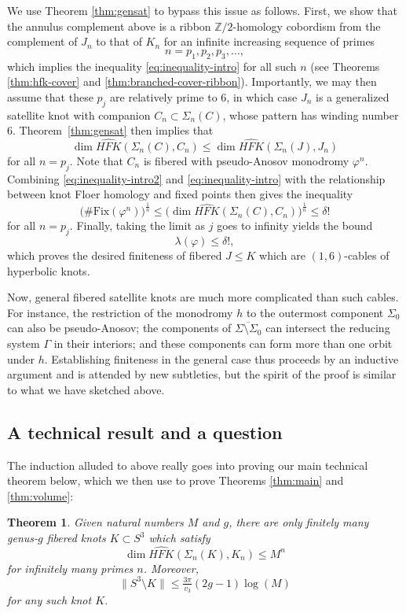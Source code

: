 \documentclass[11pt]{amsart}
\newtheorem {theorem}{Theorem}
\numberwithin{equation}{section}
\numberwithin{theorem}{section}
\theoremstyle{definition}
\newcommand{\Z}{\mathbb{Z}}
\newcommand\HFK{\widehat{\mathit{HFK}}}
\begin{document}
We use Theorem \ref{thm:gensat} to bypass this issue as follows. First, we show that the annulus complement above is a ribbon $\Z/2$-homology cobordism from the complement of $J_n$ to that of $K_n$ for an infinite increasing sequence of primes \[n=p_1, p_2, p_3,\dots,\] which  implies  the inequality \eqref{eq:inequality-intro} for all such $n$ (see Theorems \ref{thm:hfk-cover} and \ref{thm:branched-cover-ribbon}). Importantly, we may then assume that these $p_j$ are relatively prime to 6, in which case $J_n$ is a generalized satellite knot with companion $C_n\subset \Sigma_n(C)$, whose pattern has winding number 6. Theorem~\ref{thm:gensat} then implies that 
\begin{equation} \label{eq:inequality-intro2}
\dim \HFK(\Sigma_{n}(C),C_{n})\leq \dim \HFK(\Sigma_{n}(J),J_{n})
\end{equation}
for all $n=p_j$. Note that $C_n$ is fibered with pseudo-Anosov monodromy $\varphi^n$. Combining \eqref{eq:inequality-intro2} and \eqref{eq:inequality-intro} with the relationship between knot Floer homology and fixed points  then gives the inequality
\[ \big(\#\mathrm{Fix}(\varphi^n)\big)^{\frac{1}{n}}\leq \big(\dim \HFK(\Sigma_{n}(C),C_{n})\big)^{\frac{1}{n}}\leq \delta ! \]
for all $n=p_j$. Finally, taking the limit as $j$ goes to infinity yields the bound \[\lambda(\varphi) \leq \delta!,\] which proves the desired finiteness of fibered $J\leq K$ which are $(1,6)$-cables of hyperbolic knots. 

Now, general fibered satellite knots are much more complicated than such cables. For instance,  the restriction of the monodromy $h$ to the outermost component $\Sigma_0$ can also be pseudo-Anosov; the components of $\overline{\Sigma\setminus \Sigma_0}$ can   intersect the reducing system $\Gamma$ in their interiors; and these components can form more than one orbit under $h$. Establishing finiteness in the general case thus proceeds by an inductive argument and is attended by new subtleties, but the spirit of the proof is similar to what we have sketched above.



\subsection{A technical result and a question} 
The induction alluded to above really goes into proving our main technical theorem below, which we then use to prove Theorems \ref{thm:main} and \ref{thm:volume}:

\begin{theorem} \label{thm:hfk-j-finite}
Given natural numbers $M$ and $g$, there are only finitely many genus-$g$ fibered knots $K\subset S^3$ which satisfy \[\dim\HFK(\Sigma_{n}(K),K_{n})\leq M^{n}\] for infinitely many primes $n$. Moreover, \[\lVert S^3\setminus K \rVert \leq \tfrac{3\pi}{v_3}(2g-1)\log(M)\] for any such knot $K$.

\end{theorem}
\end{document}
